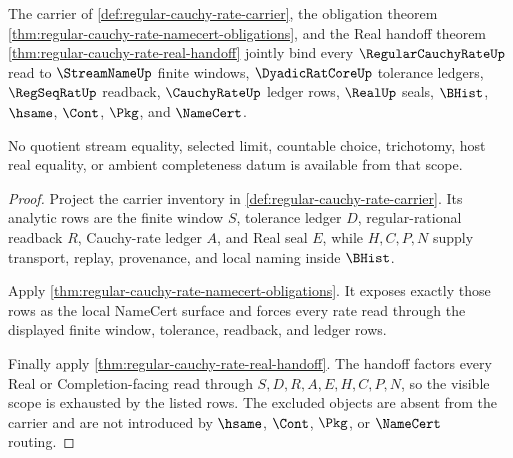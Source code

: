 \begin{theorem}
\label{thm:regular-cauchy-rate-scope-closure}
The carrier of \autoref{def:regular-cauchy-rate-carrier}, the obligation theorem \autoref{thm:regular-cauchy-rate-namecert-obligations}, and the Real handoff theorem \autoref{thm:regular-cauchy-rate-real-handoff} jointly bind every $\RegularCauchyRateUp$ read to $\StreamNameUp$ finite windows, $\DyadicRatCoreUp$ tolerance ledgers, $\RegSeqRatUp$ readback, $\CauchyRateUp$ ledger rows, $\RealUp$ seals, $\BHist$, $\hsame$, $\Cont$, $\Pkg$, and $\NameCert$.

No quotient stream equality, selected limit, countable choice, trichotomy, host real equality, or ambient completeness datum is available from that scope.
\end{theorem}
\begin{proof}
Project the carrier inventory in \autoref{def:regular-cauchy-rate-carrier}. Its analytic rows are the finite window $S$, tolerance ledger $D$, regular-rational readback $R$, Cauchy-rate ledger $A$, and Real seal $E$, while $H,C,P,N$ supply transport, replay, provenance, and local naming inside $\BHist$.

Apply \autoref{thm:regular-cauchy-rate-namecert-obligations}. It exposes exactly those rows as the local NameCert surface and forces every rate read through the displayed finite window, tolerance, readback, and ledger rows.

Finally apply \autoref{thm:regular-cauchy-rate-real-handoff}. The handoff factors every Real or Completion-facing read through $S,D,R,A,E,H,C,P,N$, so the visible scope is exhausted by the listed rows. The excluded objects are absent from the carrier and are not introduced by $\hsame$, $\Cont$, $\Pkg$, or $\NameCert$ routing.
\end{proof}



